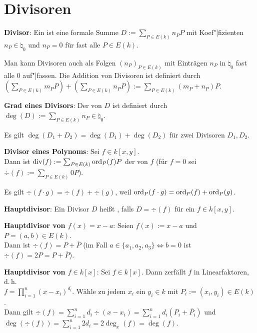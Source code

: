 \pagebreak

\section{%
    Divisoren%
}

\textbf{Divisor}:
Ein  ist eine formale Summe $D := \sum_{P \in E(k)} n_P P$ mit Koef"|fizienten
$n_P \in \natural_0$ und $n_P = 0$ für fast alle $P \in E(k)$.

Man kann Divisoren auch als Folgen $(n_P)_{P \in E(k)}$ mit Einträgen $n_P$ in $\natural_0$
fast alle $0$ auf"|fassen.
Die Addition von Divisoren ist definiert durch\\
$(\sum_{P \in E(k)} m_P P) + (\sum_{P \in E(k)} n_P P) := \sum_{P \in E(k)} (m_P + n_P) P$.

\linie

\textbf{Grad eines Divisors}:
Der  von $D$ ist definiert durch $\deg(D) := \sum_{P \in E(k)} n_P \in \natural_0$.

Es gilt $\deg(D_1 + D_2) = \deg(D_1) + \deg(D_2)$ für zwei Divisoren $D_1, D_2$.

\linie

\textbf{Divisor eines Polynoms}:
Sei $f \in k[x, y]$.\\
Dann ist $\operatorname{div}(f) := \sum_{P \in E(k)} \operatorname{ord}_P(f) P$ der  von $f$
(für $f = 0$ sei $\div(f) := \sum_{P \in E(k)} 0P$).

Es gilt $\div(f \cdot g) = \div(f) + \div(g)$, weil
$\operatorname{ord}_P(f \cdot g) = \operatorname{ord}_P(f) + \operatorname{ord}_P(g)$.

\linie

\textbf{Hauptdivisor}:
Ein Divisor $D$ heißt , falls $D = \div(f)$ für ein $f \in k[x, y]$.

\textbf{Hauptdivisor von $f(x) = x - a$}:
Seien $f(x) := x - a$ und $P = (a, b) \in E(k)$.\\
Dann ist $\div(f) = P + \overline{P}$
(im Fall $a \in \{a_1, a_2, a_3\} \iff b = 0$ ist $\div(f) = 2P = P + \overline{P}$).

\textbf{Hauptdivisor von $f \in k[x]$}:
Sei $f \in k[x]$.
Dann zerfällt $f$ in Linearfaktoren, d.\,h.\\
$f = \prod_{i=1}^n (x - x_i)^{d_i}$.
Wähle zu jedem $x_i$ ein $y_i \in k$ mit $P_i := (x_i, y_i) \in E(k)$.\\
Dann gilt $\div(f) = \sum_{i=1}^n d_i \div(x - x_i) = \sum_{i=1}^n d_i (P_i + \overline{P_i})$
und\\
$\deg(\div(f)) = \sum_{i=1}^n 2d_i = 2\deg_x(f) = \deg(f)$.

